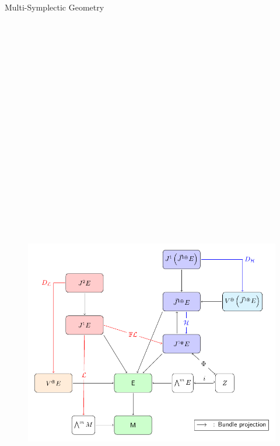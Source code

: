 \documentclass[final,20pt]{beamer}
\newlength{\onehalfcolwid}
\newlength{\threecolwid}
\begin{document}
\begin{frame}[t]
\begin{columns}[t]
\begin{column}{\threecolwid}
\begin{columns}[t,totalwidth=\threecolwid]
			\begin{column}{\onehalfcolwid}\vspace{-.6in} %
				\begin{block}{Multi-Symplectic Geometry}			
					\begin{figure}
						\includegraphics[height=32cm,keepaspectratio]{Pictures/Figure_ms_landscape}

\end{figure}
\end{block}
\end{column}
\end{columns}
\end{column}
\end{columns}
\end{frame}
\end{document}
